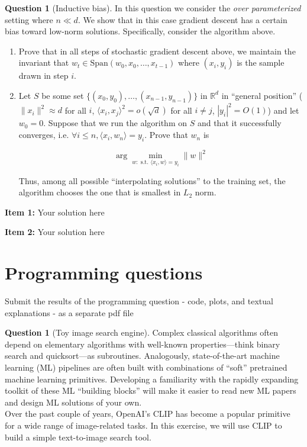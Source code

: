\documentclass{article}
\theoremstyle{definition}
\newtheorem{question}{Question}
\newtheorem{subquestion}{Question}[question]
\newenvironment{solution}{\color{blue}{\textbf{Solution \arabic{question}.\arabic{subquestion}:}\smallskip\newline}}{}
\begin{document}
\begin{subquestion}[Inductive bias]
In this question we consider the \textit{over parameterized} setting where $n\ll d$. We show that in this case gradient descent has a certain bias toward low-norm solutions. Specifically, consider the algorithm above.

\begin{enumerate}

\item Prove that in all steps of stochastic gradient descent above, we maintain the invariant that $w_t \in \mathrm{Span}(w_0,x_0,\ldots,x_{t-1})$ where $(x_i,y_i)$ is the sample drawn in step $i$. 

\item Let $S$ be some set $\{ (x_0,y_0),\ldots, (x_{n-1},y_{n-1}) \}$ in $\mathbb{R}^d$ in ``general position'' ( $\| x_i \|^2\approx d$ for all $i$, $\langle x_i,x_j \rangle^2 = o(\sqrt{d})$ for all $i \neq j$, $|y_i|^2 = O(1)$) and let $w_0 = 0$. Suppose that we run the algorithm on $S$ and that it successfully converges, i.e. $\forall i \leq n, \langle x_i, w_n \rangle = y_i$. Prove that $w_n$ is 

$$\arg\min_{w : \text{ s.t. } \langle x_i, w \rangle = y_i} \| w \|^2$$

Thus, among all possible ``interpolating solutions'' to the training set, the algorithm chooses the one that is smallest in $L_2$ norm.

\end{enumerate}
\end{subquestion}


\begin{solution}
\textbf{Item 1:} Your solution here 


\textbf{Item 2:}  Your solution here
\end{solution}

\section*{Programming questions}

{\color{blue} Submit the results of the programming question - code, plots, and textual explanations - as a separate pdf file }

\begin{question}[Toy image search engine]
Complex classical algorithms often depend on elementary algorithms with well-known properties---think binary search and quicksort---as subroutines. Analogously, state-of-the-art machine learning (ML) pipelines are often built with combinations of ``soft'' pretrained machine learning primitives. Developing a familiarity with the rapidly expanding toolkit of these ML ``building blocks'' will make it easier to read new ML papers and design ML solutions of your own. \\

Over the past couple of years, OpenAI's CLIP has become a popular primitive for a wide range of image-related tasks. In this exercise, we will use CLIP to build a simple text-to-image search tool. \\
    \end{question}
\end{document}
